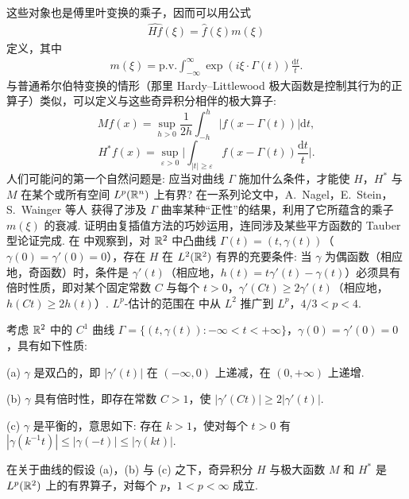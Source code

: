这些对象也是傅里叶变换的乘子，因而可以用公式
\begin{align*}
  \widehat{H f}(\xi)=\widehat{f}(\xi)m(\xi)
\end{align*}
定义，其中
\begin{align*}
  m(\xi)=\mathrm{p.v.}\int_{-\infty}^{\infty}\exp(i\xi\cdot\Gamma(t))\frac{\mathrm{d}t}{t}.
\end{align*}
与普通希尔伯特变换的情形（那里 Hardy--Littlewood 极大函数是控制其行为的正算子）类似，可以定义与这些奇异积分相伴的极大算子:
\begin{equation}\label{eq:5.8}
  M f(x)=\sup_{h>0}\frac{1}{2h}\int_{-h}^{h}\left|f(x-\Gamma(t))\right|\mathrm{d}t,
\end{equation}
\begin{equation}\label{eq:5.9}
  H^{*}f(x)=\sup_{\varepsilon>0}\Big|\int_{|t|\geq\varepsilon}f(x-\Gamma(t))\frac{\mathrm{d}t}{t}\Big|.
\end{equation}
人们可能问的第一个自然问题是: 应当对曲线 $\Gamma$ 施加什么条件，才能使 $H$，$H^*$ 与 $M$ 在某个或所有空间 $L^p(\mathbb{R}^n)$ 上有界? 在一系列论文中，A.~Nagel，E.~Stein，S.~Wainger 等人 \cite{b120,b121} 获得了涉及 $\Gamma$ 曲率某种``正性''的结果，利用了它所蕴含的乘子 $m(\xi)$ 的衰减. 证明由复插值方法的巧妙运用，连同涉及某些平方函数的 Tauber 型论证完成. 在 \cite{b121} 中观察到，对 $\mathbb{R}^2$ 中凸曲线 $\Gamma(t) = (t, \gamma(t))$（$\gamma(0) = \gamma'(0) = 0$），存在 $H$ 在 $L^2(\mathbb{R}^2)$ 有界的充要条件: 当 $\gamma$ 为偶函数（相应地，奇函数）时，条件是 $\gamma'(t)$（相应地，$h(t) = t\gamma'(t) - \gamma(t)$）必须具有倍时性质，即对某个固定常数 $C$ 与每个 $t > 0$，$\gamma'(Ct) \geq 2\gamma'(t)$（相应地，$h(Ct) \geq 2h(t)$）. $L^p$-估计的范围在 \cite{b111} 中从 $L^2$ 推广到 $L^p$，$4/3 < p < 4$.

考虑 $\mathbb{R}^2$ 中的 $C^1$ 曲线 $\Gamma = \{(t, \gamma(t)): -\infty < t < +\infty\}$，$\gamma(0) = \gamma'(0) = 0$，具有如下性质:

(a) $\gamma$ 是双凸的，即 $|\gamma'(t)|$ 在 $(-\infty, 0)$ 上递减，在 $(0, +\infty)$ 上递增.

(b) $\gamma$ 具有倍时性，即存在常数 $C > 1$，使 $|\gamma'(Ct)| \geq 2|\gamma'(t)|$.

(c) $\gamma$ 是平衡的，意思如下: 存在 $k > 1$，使对每个 $t > 0$ 有 $|\gamma(k^{-1}t)| \leq |\gamma(-t)| \leq |\gamma(kt)|$.

\begin{theorem}\label{thm:5.21}
在关于曲线的假设 (a)，(b) 与 (c) 之下，奇异积分 $H$ 与极大函数 $M$ 和 $H^*$ 是 $L^p(\mathbb{R}^2)$ 上的有界算子，对每个 $p$，$1<p<\infty$ 成立.
\end{theorem}

